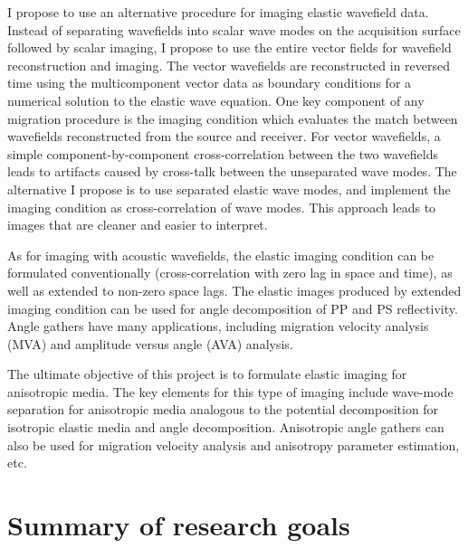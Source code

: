 I propose to use an alternative procedure for imaging elastic wavefield data. Instead of separating wavefields into scalar wave modes on the acquisition surface followed by scalar imaging, I propose to use the entire vector fields for wavefield reconstruction and imaging. 
The vector wavefields are reconstructed in reversed time using the multicomponent vector data as boundary conditions for a numerical solution to the elastic wave equation. 
One key component of any migration procedure is the imaging condition which evaluates the match between wavefields reconstructed from the source and receiver. For vector wavefields, a simple component-by-component cross-correlation between the two wavefields leads to artifacts caused by cross-talk between the unseparated wave modes. The alternative I propose is to use separated elastic wave modes, and implement the imaging condition as cross-correlation of wave modes. This approach leads to images that are cleaner and easier to interpret.

As for imaging with acoustic wavefields, the elastic imaging condition can be formulated conventionally (cross-correlation with zero lag in space and time), as well as extended to non-zero space lags. The elastic images produced by extended imaging condition can be used for angle decomposition of PP and PS reflectivity. Angle gathers have many applications, including migration velocity analysis (MVA) and amplitude versus angle (AVA) analysis.



The ultimate objective of this project is to formulate elastic imaging for anisotropic media. The key elements for this type of imaging include wave-mode separation for anisotropic media analogous to the potential decomposition for isotropic elastic media and angle decomposition. Anisotropic angle gathers can also be used for migration velocity analysis and anisotropy parameter estimation, etc. %



\newpage
{}
\section{Summary of research  goals}

